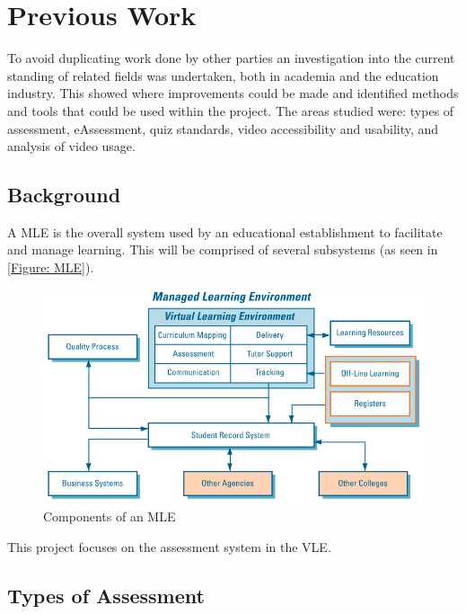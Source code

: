 \chapter{Previous Work} 
\label{Chapter:Previous Work}

\begin{preamble}
	To avoid duplicating work done by other parties an investigation into the current standing of related fields was undertaken, both in academia and the education industry. This showed where improvements could be made and identified methods and tools that could be used within the project. The areas studied were: types of assessment, eAssessment, quiz standards, video accessibility and usability, and analysis of video usage.
\end{preamble}

\section{Background}
\label{Section: Background}
A \gls{MLE} is the overall system used by an educational establishment to facilitate and manage learning. This will be comprised of several subsystems (as seen in \autoref{Figure: MLE}).

\begin{figure}[h]
	\centering 
		\includegraphics[scale=0.4]{../figures/MLE.png} 		
	\caption{\label{Figure: MLE} Components of an \gls{MLE} \citep{mle}} 	
\end{figure}

This project focuses on the assessment system in the \gls{VLE}.

\section{Types of Assessment}
\label{Section: Types of Assessment}


